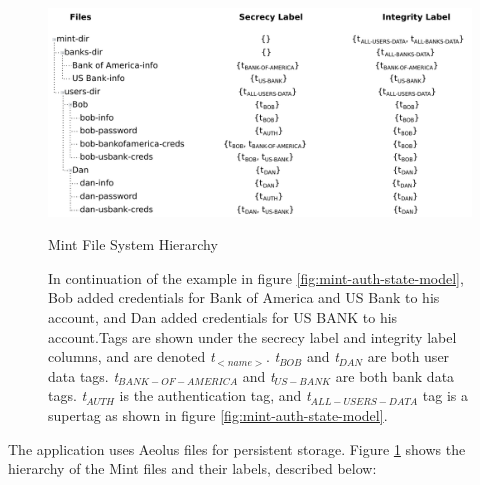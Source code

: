 \begin{figure}[h]
\centering
\includegraphics[width=\textwidth,height=\textheight,keepaspectratio]{figures/mint-filesystem}
\caption*{Mint File System Hierarchy}
\caption[Mint File System Hierarchy]{In continuation of the example in figure \ref{fig:mint-auth-state-model}, Bob added credentials for Bank of America and US Bank to his account, and Dan added credentials for US BANK to his account.Tags are shown under the secrecy label and integrity label columns, and are denoted \emph{t$_{<name>}$}. \emph{t$_{BOB}$} and \emph{t$_{DAN}$} are both user data tags. \emph{t$_{BANK-OF-AMERICA}$} and \emph{t$_{US-BANK}$} are both bank data tags. \emph{t$_{AUTH}$} is the authentication tag, and \emph{t$_{ALL-USERS-DATA}$} tag is a supertag as shown in figure \ref{fig:mint-auth-state-model}.}
\label{fig:mint-fs}
\end{figure}

The application uses Aeolus files for persistent storage. Figure \ref{fig:mint-fs} shows the hierarchy of the Mint files and their labels, described below:

